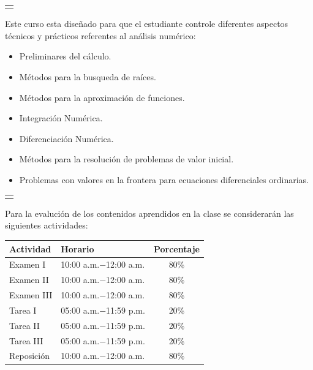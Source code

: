 \documentclass[12pt,letterpaper]{article}
\begin{document}
\begin{multicols}{2}
\begin{center}
\begin{tabular}{c}
\cellcolor{gray!40}{CONTENIDOS}
\end{tabular}
\end{center}
\hspace*{0.5cm} Este curso esta diseñado para que el estudiante controle diferentes aspectos técnicos y prácticos referentes al análisis numérico:
\begin{itemize}
\item Preliminares del cálculo.
\item Métodos para la busqueda de raíces.
\item Métodos para la aproximación de funciones.
\item Integración Numérica.
\item Diferenciación Numérica.
\item Métodos para la resolución de problemas de valor inicial. 
\item Problemas con valores en la frontera para ecuaciones diferenciales ordinarias.
\end{itemize} 
\begin{center}
\begin{tabular}{c}
\cellcolor{gray!40}{EVALUACIÓN}
\end{tabular}
\end{center}
\vspace*{0.5cm} Para la evalución de los contenidos aprendidos en la clase se considerarán las siguientes actividades:
\begin{table}[H]
\centering
\begin{tabular}{|l|l|c|}
\hline
Actividad  & Horario & Porcentaje\\\hline\hline
Examen I&10:00 a.m.$-$12:00 a.m.&80\%\\
Examen II&10:00 a.m.$-$12:00 a.m.&80\%\\
Examen III&10:00 a.m.$-$12:00 a.m.&80\%\\
Tarea I&05:00 a.m.$-$11:59 p.m.&20\%\\
Tarea II&05:00 a.m.$-$11:59 p.m.&20\%\\
Tarea III&05:00 a.m.$-$11:59 p.m.&20\%\\
Reposición &10:00 a.m.$-$12:00 a.m.&80\%\\\hline
\end{tabular}
\end{table}
\hspace*{0.5cm} 

\end{multicols}
\end{document}
